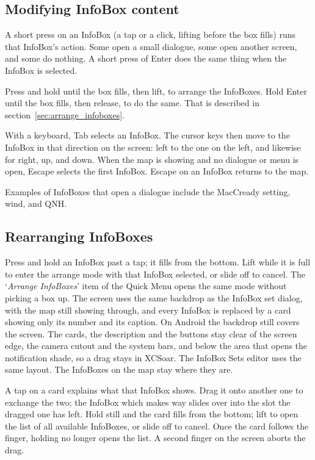 \subsection*{Modifying InfoBox content}

A short press on an InfoBox (a tap or a click, lifting before the box
fills) runs that InfoBox's action.  Some open a small dialogue, some
open another screen, and some do nothing.  A short press of Enter
does the same thing when the InfoBox is selected.

Press and hold until the box fills, then lift, to arrange the
InfoBoxes.  Hold Enter until the box fills, then release, to do the
same.  That is described in section~\ref{sec:arrange_infoboxes}.

With a keyboard, Tab selects an InfoBox.  The cursor keys then move
to the InfoBox in that direction on the screen: left to the one on
the left, and likewise for right, up, and down.  When the map is
showing and no dialogue or menu is open, Escape selects the first
InfoBox.  Escape on an InfoBox returns to the map.

Examples of InfoBoxes that open a dialogue include the MacCready
setting, wind, and QNH.


\subsection*{Rearranging InfoBoxes}\label{sec:arrange_infoboxes}

Press and hold an InfoBox past a tap; it fills from the bottom.
Lift while it is full to enter the arrange mode with that InfoBox
selected, or slide off to cancel.  The `\emph{Arrange InfoBoxes}'
item of the Quick Menu opens the same mode without picking a box up.
The screen uses the same backdrop as the InfoBox set dialog, with the
map still showing through, and every InfoBox is replaced by a card
showing only its number and its caption.
On Android the backdrop still covers the screen.  The cards, the
description and the buttons stay clear of the screen edge, the camera
cutout and the system bars, and below the area that opens the
notification shade, so a drag stays in XCSoar.  The InfoBox Sets
editor uses the same layout.  The InfoBoxes on the map stay where
they are.

A tap on a card explains what that InfoBox shows.  Drag it onto
another one to exchange the two; the InfoBox which makes way slides
over into the slot the dragged one has left.  Hold still and the card fills from the bottom; lift to open the
list of all available InfoBoxes, or slide off to cancel.  Once the
card follows the finger, holding no longer opens the list.  A second
finger on the screen aborts the drag.

